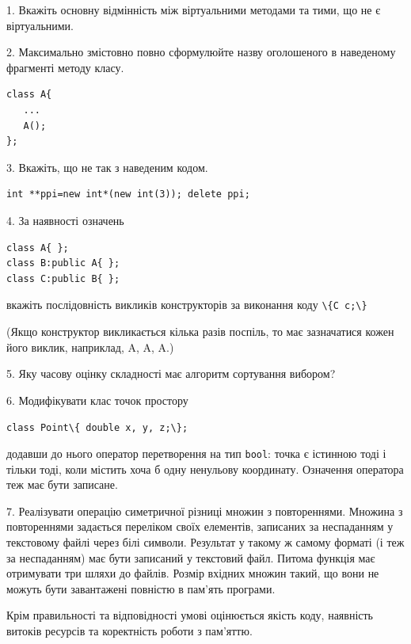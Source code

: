 \documentclass[12pt, ukrainian]{article}
\def\code#1{\Verb!#1!}
\begin{document}
{%
1. Вкажіть основну відмінність між віртуальними методами та тими, що не є віртуальними.%
\par
\vspace{2mm}
2. Максимально змістовно повно сформулюйте назву оголошеного в наведеному фрагменті методу класу.
\vspace{-3mm}
\begin{verbatim}class A{
   ...
   A();
};\end{verbatim}
\vspace{-3mm}
\par
\vspace{2mm}
3. Вкажіть, що не так з наведеним кодом.
\vspace{-3mm}
\begin{verbatim}int **ppi=new int*(new int(3)); delete ppi;\end{verbatim}
\vspace{-3mm}
\par
\vspace{2mm}
4. За наявності означень
\vspace{-3mm}
\begin{verbatim}
class A{ };
class B:public A{ };
class C:public B{ };\end{verbatim}
\vspace{-3mm}
вкажіть послідовність викликів конструкторів за виконання коду \code{\{C c;\}} 

(Якщо конструктор викликається кілька разів поспіль, то має зазначатися кожен його виклик, наприклад, A, A, A.)

\vspace{2mm}
5. Яку часову оцінку складності має алгоритм сортування вибором?
\par
\vspace{2mm}
6. Модифікувати клас точок простору 

\qquad\code{class Point\{ double x, y, z;\};}


додавши до нього оператор перетворення на тип \code{bool}: точка є істинною тоді і тільки тоді, коли містить хоча б одну ненульову координату. Означення оператора теж має бути записане.%
\par
\vspace{2mm}
7. 
Реалізувати операцію симетричної різниці множин з повтореннями. Множина з повтореннями задається переліком своїх елементів, записаних за неспаданням у текстовому файлі через білі символи. Результат у такому ж самому форматі (і теж за неспаданням) має бути записаний у текстовий файл. Питома функція має отримувати три шляхи до файлів. Розмір вхідних множин такий, що вони не можуть бути завантажені повністю в пам’ять програми.

Крім правильності та відповідності умові оцінюється якість коду, наявність витоків ресурсів та коректність роботи з пам'яттю. 

}
\end{document}
